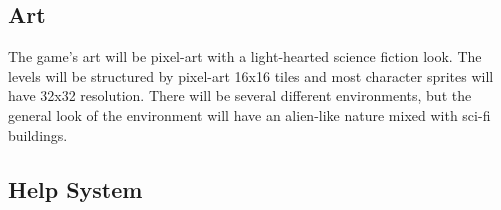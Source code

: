 \documentclass[12pt]{article}
\begin{document}
\subsection{Art}

The game's art will be pixel-art with a light-hearted science fiction look. The levels will be structured by pixel-art 16x16 tiles and most character sprites will have 32x32 resolution. There will be several different environments, but the general look of the environment will have an alien-like nature mixed with sci-fi buildings. 

\subsection{Help System}
\end{document}
